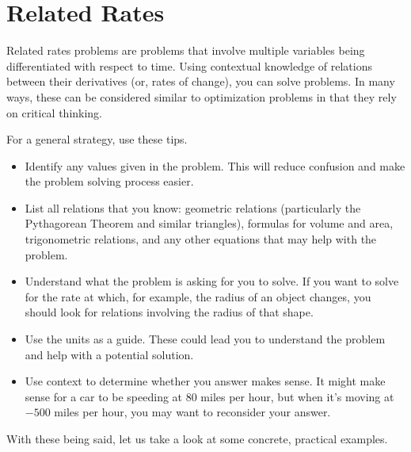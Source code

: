 \section{Related Rates}

Related rates problems are problems that involve multiple variables being differentiated with respect to time. Using contextual knowledge of relations between their derivatives (or, rates of change), you can solve problems. In many ways, these can be considered similar to optimization problems in that they rely on critical thinking.

For a general strategy, use these tips.

\begin{itemize}
    \item Identify any values given in the problem. This will reduce confusion and make the problem solving process easier.
    \item List all relations that you know: geometric relations (particularly the Pythagorean Theorem and similar triangles), formulas for volume and area, trigonometric relations, and any other equations that may help with the problem.
    \item Understand what the problem is asking for you to solve. If you want to solve for the rate at which, for example, the radius of an object changes, you should look for relations involving the radius of that shape.
    \item Use the units as a guide. These could lead you to understand the problem and help with a potential solution.
    \item Use context to determine whether you answer makes sense. It might make sense for a car to be speeding at \( 80 \) miles per hour, but when it's moving at \( -500 \) miles per hour, you may want to reconsider your answer.
\end{itemize}

With these being said, let us take a look at some concrete, practical examples.

